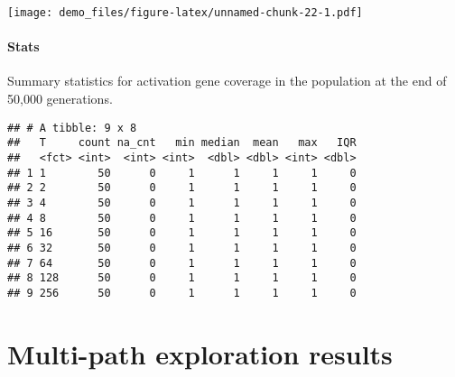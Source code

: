\documentclass[]{book}
\newenvironment{Shaded}{\begin{snugshade}}{\end{snugshade}}
\newcommand{\DataTypeTok}[1]{\textcolor[rgb]{0.13,0.29,0.53}{#1}}
\newcommand{\KeywordTok}[1]{\textcolor[rgb]{0.13,0.29,0.53}{\textbf{#1}}}
\newcommand{\NormalTok}[1]{#1}
\newcommand{\OperatorTok}[1]{\textcolor[rgb]{0.81,0.36,0.00}{\textbf{#1}}}
\newcommand{\OtherTok}[1]{\textcolor[rgb]{0.56,0.35,0.01}{#1}}
\newcommand{\StringTok}[1]{\textcolor[rgb]{0.31,0.60,0.02}{#1}}
\let\oldparagraph\paragraph
\renewcommand{\paragraph}[1]{\oldparagraph{#1}\mbox{}}
\begin{document}
\texttt{[image: demo\_files/figure-latex/unnamed-chunk-22-1.pdf]}

\hypertarget{stats-21}{%
\paragraph{Stats}\label{stats-21}}

Summary statistics for activation gene coverage in the population at the end of 50,000 generations.

\begin{Shaded}
\end{Shaded}

\begin{verbatim}
## # A tibble: 9 x 8
##   T     count na_cnt   min median  mean   max   IQR
##   <fct> <int>  <int> <int>  <dbl> <dbl> <int> <dbl>
## 1 1        50      0     1      1     1     1     0
## 2 2        50      0     1      1     1     1     0
## 3 4        50      0     1      1     1     1     0
## 4 8        50      0     1      1     1     1     0
## 5 16       50      0     1      1     1     1     0
## 6 32       50      0     1      1     1     1     0
## 7 64       50      0     1      1     1     1     0
## 8 128      50      0     1      1     1     1     0
## 9 256      50      0     1      1     1     1     0
\end{verbatim}

\hypertarget{multi-path-exploration-results-1}{%
\section{Multi-path exploration results}\label{multi-path-exploration-results-1}}
\end{document}
